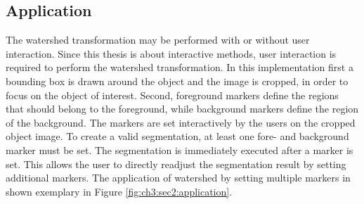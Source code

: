 \subsection{Application}\label{ord:ch3:sec2:subsec2}
The watershed transformation may be performed with or without user interaction.
Since this thesis is about interactive methods, user interaction is required to perform the watershed transformation.
In this implementation first a bounding box is drawn around the object and the image is cropped, in order to focus on the object of interest.
Second, foreground markers define the regions that should belong to the foreground, while background markers define the region of the background.
The markers are set interactively by the users on the cropped object image.
To create a valid segmentation, at least one fore- and background marker must be set.
The segmentation is immediately executed after a marker is set.
This allows the user to directly readjust the segmentation result by setting additional markers.
The application of watershed by setting multiple markers in shown exemplary in Figure \ref{fig:ch3:sec2:application}.

